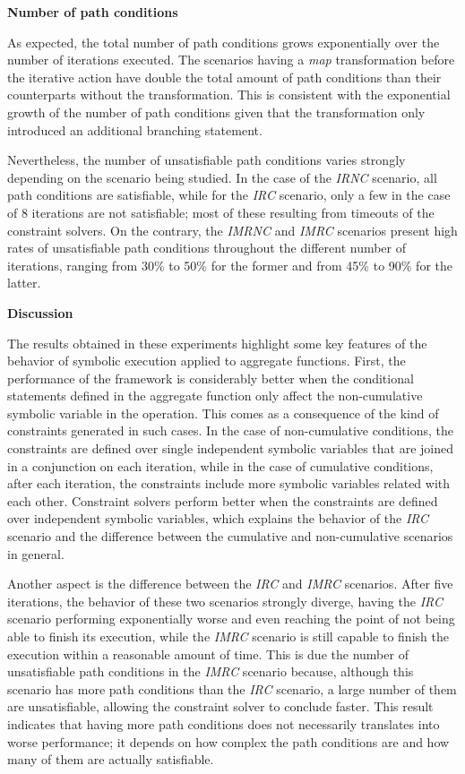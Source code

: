 \textbf{Number of path conditions}

As expected, the total number of path conditions grows exponentially over the number of iterations executed. The scenarios having a \textit{map} transformation before the iterative action have double the total amount of path conditions than their counterparts without the transformation. This is consistent with the exponential growth of the number of path conditions given that the transformation only introduced an additional branching statement.

Nevertheless, the number of unsatisfiable path conditions varies strongly depending on the scenario being studied. In the case of the \textit{IRNC} scenario, all path conditions are satisfiable, while for the \textit{IRC} scenario, only a few in the case of 8 iterations are not satisfiable; most of these resulting from timeouts of the constraint solvers. On the contrary, the \textit{IMRNC} and \textit{IMRC} scenarios present high rates of unsatisfiable path conditions throughout the different number of iterations, ranging from 30\% to 50\% for the former and from 45\% to 90\% for the latter.

\textbf{Discussion}

The results obtained in these experiments highlight some key features of the behavior of symbolic execution applied to aggregate functions. First, the performance of the framework is considerably better when the conditional statements defined in the aggregate function only affect the non-cumulative symbolic variable in the operation. This comes as a consequence of the kind of constraints generated in such cases. In the case of non-cumulative conditions, the constraints are defined over single independent symbolic variables that are joined in a conjunction on each iteration, while in the case of cumulative conditions, after each iteration, the constraints include more symbolic variables related with each other. Constraint solvers perform better when the constraints are defined over independent symbolic variables, which explains the behavior of the \textit{IRC} scenario and the difference between the cumulative and non-cumulative scenarios in general.

Another aspect is the difference between the \textit{IRC} and \textit{IMRC} scenarios. After five iterations, the behavior of these two scenarios strongly diverge, having the \textit{IRC} scenario performing exponentially worse and even reaching the point of not being able to finish its execution, while the \textit{IMRC} scenario is still capable to finish the execution within a reasonable amount of time. This is due the number of unsatisfiable path conditions in the \textit{IMRC} scenario because, although this scenario has more path conditions than the \textit{IRC} scenario, a large number of them are unsatisfiable, allowing the constraint solver to conclude faster. This result indicates that having more path conditions does not necessarily translates into worse performance; it depends on how complex the path conditions are and how many of them are actually satisfiable.

